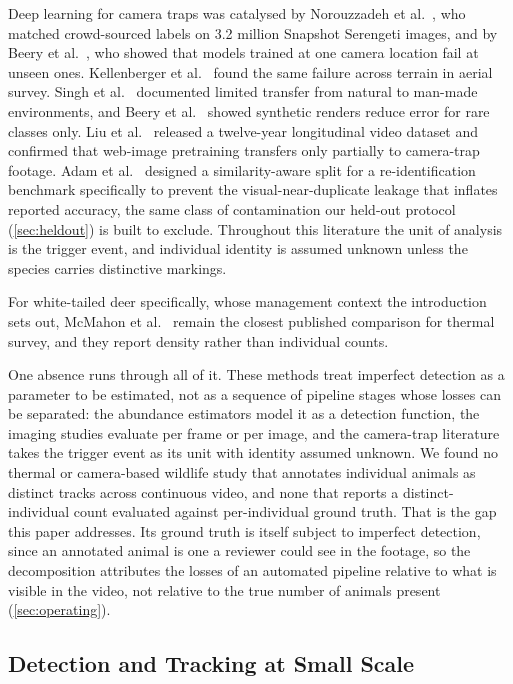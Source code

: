 Deep learning for camera traps was catalysed by Norouzzadeh et
al.~\cite{norouzzadeh2018automatically}, who matched crowd-sourced labels on 3.2 million
Snapshot Serengeti images, and by Beery et al.~\cite{beery2018recognition}, who showed that
models trained at one camera location fail at unseen ones. Kellenberger et
al.~\cite{kellenberger2018detecting} found the same failure across terrain in aerial survey.
Singh et al.~\cite{singh2020animal} documented limited transfer from natural to man-made environments, and Beery et al.~\cite{beery2020synthetic} showed synthetic renders reduce error
for rare classes only. Liu et al.~\cite{liu2023lote} released a twelve-year longitudinal video
dataset and confirmed that web-image pretraining transfers only partially to camera-trap footage. Adam
et al.~\cite{adam2025wildlifereid10k} designed a similarity-aware split for a
re-identification benchmark specifically to prevent the visual-near-duplicate leakage that
inflates reported accuracy, the same class of contamination our held-out protocol
(\cref{sec:heldout}) is built to exclude. Throughout this literature the unit of analysis is
the trigger event, and individual identity is assumed unknown unless the species carries
distinctive markings.

For white-tailed deer specifically, whose management context the introduction sets out,
McMahon et al.~\cite{mcmahon2021comparing} remain the closest published comparison for thermal
survey, and they report density rather than individual counts.

One absence runs through all of it. These methods treat imperfect detection as a parameter
to be estimated, not as a sequence of pipeline stages whose losses can be separated:
the abundance estimators model it as a detection function, the imaging studies evaluate per
frame or per image, and the camera-trap literature takes the trigger event as its unit with
identity assumed unknown. We found no thermal or camera-based wildlife study that annotates
individual animals as distinct tracks across continuous video, and none that reports a
distinct-individual count evaluated against per-individual ground truth. That is the gap this
paper addresses. Its ground truth is itself subject to imperfect detection, since an annotated
animal is one a reviewer could see in the footage, so the decomposition attributes the losses
of an automated pipeline relative to what is visible in the video, not relative to the true
number of animals present (\cref{sec:operating}).

\subsection{Detection and Tracking at Small Scale}

